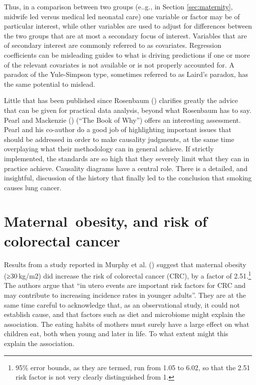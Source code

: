 \documentclass[
  10ptls,
  b5paper]{book}
\begin{document}
Thus, in a comparison between two groups (e..g., in Section \ref{sec:maternity}, midwife led versus medical led neonatal care) one variable or factor may be of particular interest, while other variables are used to adjust for differences between the two groups that are at most a secondary focus of interest. Variables that are of secondary interest are commonly referred to as covariates. Regression coefficients can be misleading guides to what is driving predictions if one or more of the relevant covariates is not available or is not properly accounted for. A paradox of the Yule-Simpson type, sometimes referred to as Laird's paradox, has the same potential to mislead.

Little that has been published since Rosenbaum () clarifies greatly the advice that can be given for practical data analysis, beyond what Rosenbaum has to say. Pearl and Mackenzie () (``The Book of Why'') offers an interesting assessment. Pearl and his co-author do a good job of highlighting important issues that should be addressed in order to make causality judgments, at the same time overplaying what their methodology can in general achieve. If strictly implemented, the standards are so high that they severely limit what they can in practice achieve. Causality diagrams have a central role. There is a detailed, and insightful, discussion of the history that finally led to the conclusion that smoking causes lung cancer.

\section{Maternal~obesity, and risk of colorectal cancer}\label{maternal-obesity-and-risk-of-colorectal-cancer}

Results from a study reported in Murphy et al. () suggest that maternal obesity (≥30 kg/m2) did increase the risk of colorectal cancer (CRC), by a factor of 2.51.\footnote{95\% error bounds, as they are termed, run from 1.05 to 6.02, so that the 2.51 risk factor is not very clearly distinguished from 1.} The authors argue that ``in utero events are important risk factors for CRC and may contribute to increasing incidence rates in younger adults''. They are at the same time careful to acknowledge that, as an observational study, it could not establish cause, and that factors such as diet and microbiome might explain the association. The eating habits of mothers must surely have a large effect on what children eat, both when young and later in life. To what extent might this explain the association.
\end{document}

